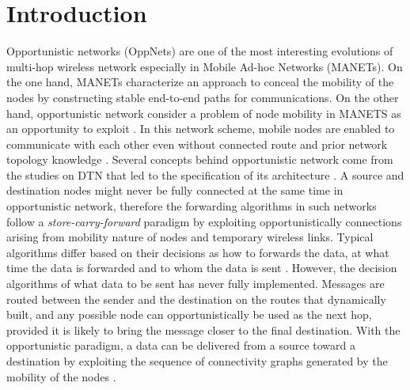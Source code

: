\chapter{Introduction}
\label{intro}

Opportunistic networks (OppNets) are one of the most interesting evolutions of multi-hop wireless network especially in Mobile Ad-hoc Networks (MANETs).
On the one hand, MANETs characterize an approach to conceal the mobility of the nodes by constructing stable end-to-end paths for communications. 
On the other hand, opportunistic network consider a problem of node mobility in MANETS as an opportunity to exploit \cite{Conti2014}.
In this network scheme, mobile nodes are enabled to communicate with each other even without connected route and prior network topology knowledge \cite{Pelusi2006}.
Several concepts behind opportunistic network come from the studies on DTN that led to the specification of its architecture \cite{Conan2008,Yu2012,Rongxing2010,Schurgot2012}. 
A source and destination nodes might never be fully connected at the same time in opportunistic network, therefore the forwarding algorithms in such networks follow a \emph{store-carry-forward} paradigm \cite{Yamamura2011,Jie2007,Jie2007a} by exploiting opportunistically connections arising from mobility nature of nodes and temporary wireless links. 
Typical algorithms differ based on their decisions as how to forwards the data, at what time the data is forwarded and to whom the data is sent \cite{Joe2010}. 
However, the decision algorithms of what data to be sent has never fully implemented. 
Messages are routed between the sender and the destination on the routes that dynamically built, and any possible node can opportunistically be used as the next hop, provided it is likely to bring the message closer to the final destination.
With the opportunistic paradigm, a data can be delivered from a source toward a destination by exploiting the sequence of connectivity graphs generated by the mobility of the nodes \cite{Acer20111,Ferretti2013}.

